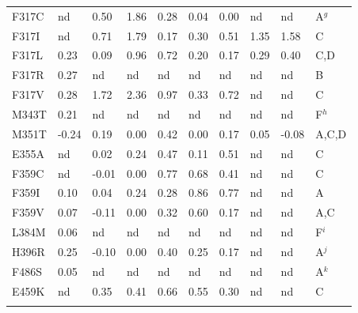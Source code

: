 \documentclass[phd,tocprelim]{cornell}
\begin{document}
\begin{landscape}
\begin{ThreePartTable}
\begin{longtable}[c]{llllllllll}
		{F317C} & {nd}  		& {0.50}        & {1.86}        & {0.28}        & {0.04}        & {0.00}        & {nd}  		& {nd}  	& {A$^{g}$} \\
		{F317I} & {nd}  		& {0.71}        & {1.79}        & {0.17}        & {0.30}        & {0.51}        & {1.35}        & {1.58}    & {C}       \\
		{F317L} & {0.23}        & {0.09}        & {0.96}        & {0.72}        & {0.20}        & {0.17}        & {0.29}        & {0.40}    & {C,D}     \\
		{F317R} & {0.27}        & {nd}  		& {nd}  		& {nd}  		& {nd}  		& {nd}  		& {nd}  		& {nd}  	& {B}		\\
		{F317V} & {0.28}        & {1.72}        & {2.36}        & {0.97}        & {0.33}        & {0.72}        & {nd}  		& {nd}  	& {C}       \\
		{M343T} & {0.21}        & {nd}  		& {nd}  		& {nd}  		& {nd}  		& {nd}  		& {nd}  		& {nd}  	& {F$^{h}$}	\\
		{M351T} & {-0.24}       & {0.19}        & {0.00}        & {0.42}        & {0.00}        & {0.17}        & {0.05}        & {-0.08}	& {A,C,D}	\\
		{E355A} & {nd}  		& {0.02}        & {0.24}        & {0.47}        & {0.11}        & {0.51}        & {nd}  		& {nd}  	& {C}       \\
		{F359C} & {nd}  		& {-0.01}       & {0.00}        & {0.77}        & {0.68}        & {0.41}        & {nd}  		& {nd}  	& {C}       \\
		{F359I} & {0.10}        & {0.04}        & {0.24}        & {0.28}        & {0.86}        & {0.77}        & {nd}  		& {nd}  	& {A}       \\
		{F359V} & {0.07}        & {-0.11}       & {0.00}        & {0.32}        & {0.60}        & {0.17}        & {nd}  		& {nd}  	& {A,C}		\\
		{L384M} & {0.06}        & {nd}  		& {nd}  		& {nd}  		& {nd}  		& {nd}  		& {nd}  		& {nd}  	& {F$^{i}$}	\\
		{H396R} & {0.25}        & {-0.10}       & {0.00}        & {0.40}        & {0.25}        & {0.17}        & {nd}  		& {nd}  	& {A$^{j}$}	\\
		{F486S} & {0.05}        & {nd}  		& {nd}  		& {nd}  		& {nd}  		& {nd}  		& {nd}  		& {nd}  	& {A$^{k}$}	\\
		{E459K} & {nd}  		& {0.35}        & {0.41}        & {0.66}        & {0.55}        & {0.30}        & {nd}  		& {nd}  	& {C}       \\
		\bottomrule
		\insertTableNotes  %
\end{longtable}
\end{ThreePartTable}
\end{landscape}
\end{document}

